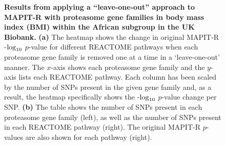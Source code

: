 \documentclass[10pt]{article}
\def\log{{\rm log}}
\begin{document}
\begin{figure}[H]
{\begin{tabular}{|cc|ccc|}
  \hline
\end{tabular}}
\caption{\textbf{Results from applying a ``leave-one-out'' approach to MAPIT-R with proteasome gene families in body mass index (BMI) within the African subgroup in the UK Biobank.} \textbf{(a)} The heatmap shows the change in original MAPIT-R -$\log_{10}$ $p$-value for different REACTOME pathways when each proteasome gene family is removed one at a time in a `leave-one-out' manner. The $x$-axis shows each proteasome gene family and the $y$-axis lists each REACTOME pathway. Each column has been scaled by the number of SNPs present in the given gene family and, as a result, the heatmap specifically shows the -$\log_{10}$ $p$-value change per SNP. \textbf{(b)} The table shows the number of SNPs present in each proteasome gene family (left), as well as the number of SNPs present in each REACTOME pathway (right). The original MAPIT-R $p$-values are also shown for each pathway (right).}
\label{InterPath-Supp-Figure-Prot-Heatplots-African}
\end{figure}
\clearpage

\end{document}
